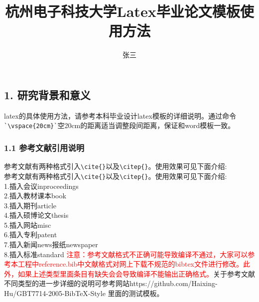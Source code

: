 \documentclass[bachelor_p]{open-report}
\title{杭州电子科技大学Latex毕业论文模板使用方法}{Munual of latex on thesis for HDU}%
\author{张三}{San Zhang}%
\begin{document}
\makecover


\reporttitle


\section{\introduction}

\subsection{1. 研究背景和意义}

latex的具体使用方法，请参考本科毕业设计latex模板的详细说明。通过命令\verb+`\vspace{20cm}`+空20cm的距离适当调整段间距离，保证和word模板一致。


\subsubsection{1.1 参考文献引用说明}
参考文献有两种格式引入\verb+\cite{}+以及\verb+\citep{}+。使用效果可见下面介绍:\\
参考文献有两种格式引入\verb+\cite{}+以及\verb+\citep{}+。使用效果可见下面介绍:\\
1.插入会议inproceedings\cite{zhao2015bearing0}\\
2.插入教材课本book\cite{williams1991probability,chengzhaolin2006,zhangsan2007}\\
3.插入期刊article\cite{cao2011formation,xue2015formation}\\
4.插入硕博论文thesis\cite{lisi2015,wangwu2015,deans2005bearings}\\
5.插入网站misc\cite{irdawebsite,h7n9,wikipedia_moores_law}\\
6.插入专利patent\cite{xiao2012yi,p6915001}\\
7.插入新闻news报纸newspaper\cite{zhang2000,renminribao}\\
8.插入标准standard\cite{gbt3469-1983}
\textcolor{red}{注意：参考文献格式不正确可能导致编译不通过，大家可以参考本工程中reference.bib中文献格式对网上下载不规范的bibtex文件进行修改。此外，如果上述类型里面条目有缺失会会导致编译不能输出正确格式。}关于参考文献不同类型的进一步详细的说明可参考网站https://github.com/Haixing-Hu/GBT7714-2005-BibTeX-Style
里面的测试模板。
\end{document}
